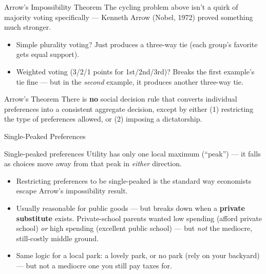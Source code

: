 \documentclass[11pt,aspectratio=169]{beamer}
\begin{document}
\begin{frame}{Arrow's Impossibility Theorem}
  The cycling problem above isn't a quirk of majority voting specifically --- Kenneth Arrow (Nobel, 1972) proved something much stronger.
  \begin{itemize}
    \item Simple plurality voting? Just produces a three-way tie (each group's favorite gets equal support).
    \item Weighted voting (3/2/1 points for 1st/2nd/3rd)? Breaks the first example's tie fine --- but in the \emph{second} example, it produces another three-way tie.
  \end{itemize}
  \begin{block}{Arrow's Theorem}
    There is \textbf{no} social decision rule that converts individual preferences into a consistent aggregate decision, except by either (1) restricting the type of preferences allowed, or (2) imposing a dictatorship.
  \end{block}
\end{frame}

\begin{frame}{Single-Peaked Preferences}
  \begin{block}{Single-peaked preferences}
    Utility has only one local maximum (``peak'') --- it falls as choices move away from that peak in \emph{either} direction.
  \end{block}
  \begin{itemize}
    \item Restricting preferences to be single-peaked is the standard way economists escape Arrow's impossibility result.
    \item Usually reasonable for public goods --- but breaks down when a \textbf{private substitute} exists. Private-school parents wanted low spending (afford private school) \emph{or} high spending (excellent public school) --- but \emph{not} the mediocre, still-costly middle ground.
    \item Same logic for a local park: a lovely park, or no park (rely on your backyard) --- but not a mediocre one you still pay taxes for.
  \end{itemize}
\end{frame}
\end{document}
